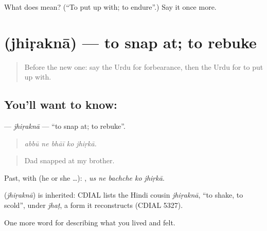 \begin{tcolorbox}[breakable,colback=teal!4,colframe=teal!35!black,title={Before you move on}]
What does   mean? (\textquotedblleft{}To put up with; to endure\textquotedblright{}.) Say it once more.
\end{tcolorbox}
\section[\texorpdfstring{\ur{جھڑکنا} (jhiṛaknā)}{جھڑکنا (jhiṛaknā)}]{ (jhiṛaknā) — to snap at; to rebuke}

\label{lesson:UR-C458-jhirakna}



\begin{quote}
Before the new one: say the Urdu for forbearance, then the Urdu for to put up with.
\end{quote}

\subsection*{You'll want to know: }
\textbf{} — \emph{jhiṛaknā} — \textquotedblleft{}to snap at; to rebuke\textquotedblright{}.

\begin{quote}
    
\end{quote}

\begin{quote}
\emph{abbū ne bhāī ko jhiṛkā.}
\end{quote}

\begin{quote}
Dad snapped at my brother.
\end{quote}

Past, with  (he or she …):     , \emph{us ne bachche ko jhiṛkā}.

\begin{cousinweb}
\textbf{} (\emph{jhiṛaknā}) is inherited: CDIAL lists the Hindi cousin \emph{jhiṛaknā}, \textquotedblleft{}to shake, to scold\textquotedblright{}, under \emph{jhaṭ}, a form it reconstructs (CDIAL 5327).
\end{cousinweb}

\begin{grammarlens}[title={What you've built}]
One more word for describing what you lived and felt.
\end{grammarlens}


